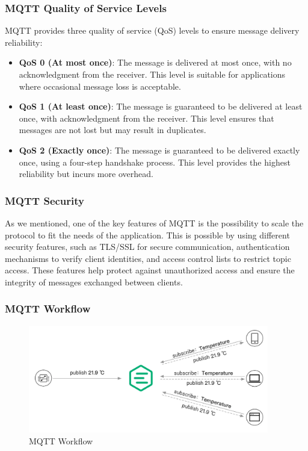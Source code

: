 \subsubsection{MQTT Quality of Service Levels}

MQTT provides three quality of service (QoS) levels to ensure message delivery reliability:
\begin{itemize}
    \item \textbf{QoS 0 (At most once)}: The message is delivered at most once, with no acknowledgment from the receiver. This level is suitable for applications where occasional message loss is acceptable.
    \item \textbf{QoS 1 (At least once)}: The message is guaranteed to be delivered at least once, with acknowledgment from the receiver. This level ensures that messages are not lost but may result in duplicates.
    \item \textbf{QoS 2 (Exactly once)}: The message is guaranteed to be delivered exactly once, using a four-step handshake process. This level provides the highest reliability but incurs more overhead.
\end{itemize}

\subsubsection{MQTT Security}

As we mentioned, one of the key features of MQTT is the possibility to scale the protocol to fit the needs of the application. This is possible by using different security features, such as TLS/SSL for secure communication, authentication mechanisms to verify client identities, and access control lists to restrict topic access. These features help protect against unauthorized access and ensure the integrity of messages exchanged between clients.

\subsubsection{MQTT Workflow}

\begin{figure}[h]
    \centering
    \includegraphics[width=10.5cm,height=4.7cm]{img/mqtt-workflow-example.png}
    \caption{MQTT Workflow}
    \label{fig:mqtt-workflow}
\end{figure}

